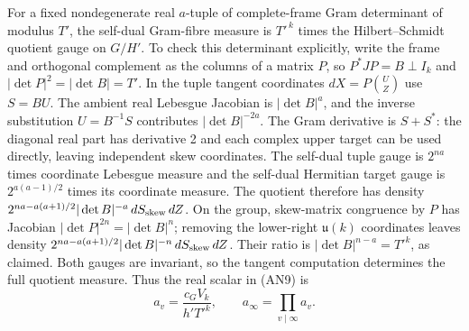 For a fixed nondegenerate real \(a\)-tuple of complete-frame
Gram determinant of modulus \(T'\), the self-dual Gram-fibre
measure is \(T'^{\,k}\) times the Hilbert--Schmidt quotient
gauge on \(G/H'\). To check this determinant explicitly,
write the frame and orthogonal complement as the columns
of a matrix \(P\), so \(P^*JP=B\perp I_k\) and
\(|\det P|^2=|\det B|=T'\). In the tuple tangent coordinates
\(dX=P\binom{U}{Z}\) use \(S=BU\). The ambient real Lebesgue
Jacobian is \(|\det B|^a\), and the inverse substitution
\(U=B^{-1}S\) contributes \(|\det B|^{-2a}\).
The Gram derivative is \(S+S^*\): the diagonal real part
has derivative 2 and each complex upper target can be
used directly, leaving independent skew coordinates.
The self-dual tuple gauge is \(2^{na}\) times coordinate
Lebesgue measure and the self-dual Hermitian target gauge is
\(2^{a(a-1)/2}\) times its coordinate measure. The quotient
therefore has density
\(2^{na-a(a+1)/2}|\det B|^{-a}\,dS_{\rm skew}\,dZ\).
On the group, skew-matrix congruence by \(P\) has Jacobian
\(|\det P|^{2n}=|\det B|^n\); removing the lower-right
\(\mathfrak u(k)\) coordinates leaves density
\(2^{na-a(a+1)/2}|\det B|^{-n}\,dS_{\rm skew}\,dZ\).
Their ratio is \(|\det B|^{n-a}=T'^k\), as claimed.
Both gauges are invariant, so the tangent computation
determines the full quotient measure. Thus the real scalar
in (AN9) is
\[
              a_v=\frac{c_G V_k}{h'T'^k},\qquad
              a_\infty=\prod_{v\mid\infty}a_v.          \tag{AN11}
\]

